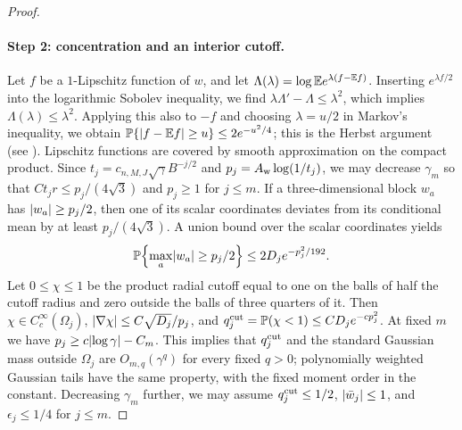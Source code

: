 \begin{proof}
\paragraph{Step 2: concentration and an interior cutoff.}
Let $f$ be a $1$-Lipschitz function of $w$, and let $\Lambda(\lambda)=\log\mathbb E e^{\lambda(f-\mathbb E f)}$. Inserting $e^{\lambda f/2}$ into the logarithmic Sobolev inequality, we find $\lambda\Lambda'-\Lambda\le\lambda^2$, which implies $\Lambda(\lambda)\le\lambda^2$. Applying this also to $-f$ and choosing $\lambda=u/2$ in Markov's inequality, we obtain $\mathbb P\{\lvert f-\mathbb E f\rvert\ge u\}\le2e^{-u^2/4}$; this is the Herbst argument (see \cite[Section~2.3]{Ledoux1999}). Lipschitz functions are covered by smooth approximation on the compact product. Since $t_j=c_{n,M,J}\sqrt\gamma B^{-j/2}$ and $p_j=A_{\rm w}\log(1/t_j)$, we may decrease $\gamma_m$ so that $Ct_jr\le p_j/(4\sqrt3)$ and $p_j\ge1$ for $j\le m$. If a three-dimensional block $w_a$ has $\lvert w_a\rvert\ge p_j/2$, then one of its scalar coordinates deviates from its conditional mean by at least $p_j/(4\sqrt3)$. A union bound over the scalar coordinates yields
\[
 \mathbb P\Bigl\{\max_a\lvert w_a\rvert\ge p_j/2\Bigr\}\le2D_je^{-p_j^2/192}.
\]
Let $0\le\chi\le1$ be the product radial cutoff equal to one on the balls of half the cutoff radius and zero outside the balls of three quarters of it. Then $\chi\in C_c^\infty(\Omega_j)$, $\lvert \nabla\chi\rvert\le C\sqrt{D_j}/p_j$, and $q_j^{\rm cut}=\mathbb P(\chi<1)\le CD_je^{-cp_j^2}$. At fixed $m$ we have $p_j\ge c\lvert \log\gamma\rvert-C_m$. This implies that $q_j^{\rm cut}$ and the standard Gaussian mass outside $\Omega_j$ are $O_{m,q}(\gamma^q)$ for every fixed $q>0$; polynomially weighted Gaussian tails have the same property, with the fixed moment order in the constant. Decreasing $\gamma_m$ further, we may assume $q_j^{\rm cut}\le1/2$, $\lvert \bar w_j\rvert\le1$, and $\epsilon_j\le1/4$ for $j\le m$.


\end{proof}
